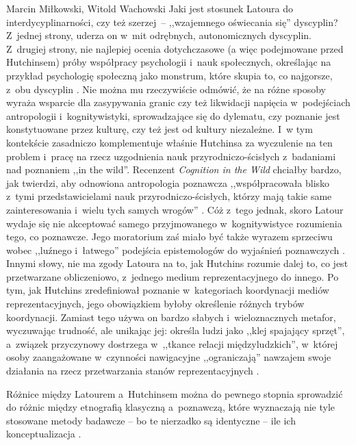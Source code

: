 \begin{artplenv2auth}{Marcin Miłkowski, Witold Wachowski}
Jaki jest stosunek Latoura do interdycyplinarności, czy też szerzej~-- ,,wzajemnego oświecania się'' dyscyplin? Z~jednej strony, uderza on w~mit odrębnych, autonomicznych dyscyplin. Z~drugiej strony, nie najlepiej ocenia dotychczasowe (a więc podejmowane przed Hutchinsem) próby współpracy psychologii i~nauk społecznych, określając na przykład psychologię społeczną jako monstrum, które skupia to, co najgorsze, z~obu dyscyplin
\parencite[][s.~58]{latour_cogito_1996}. %
 Nie można mu rzeczywiście odmówić, że na różne sposoby wyraża wsparcie dla zasypywania granic czy też likwidacji napięcia w~podejściach antropologii i~kognitywistyki, sprowadzające się do dylematu, czy poznanie jest konstytuowane przez kulturę, czy też jest od kultury niezależne. I~w tym kontekście zasadniczo komplementuje właśnie Hutchinsa za wyczulenie na ten problem i~pracę na rzecz uzgodnienia nauk przyrodniczo-ścisłych z~badaniami nad poznaniem ,,in the wild''. Recenzent \textit{Cognition in the Wild} chciałby bardzo, jak twierdzi, aby odnowiona antropologia poznawcza ,,współpracowała blisko z~tymi przedstawicielami nauk przyrodniczo-ścisłych, którzy mają takie same zainteresowania i~wielu tych samych wrogów'' 
\parencite[][s.~61]{latour_cogito_1996}. %
 Cóż z~tego jednak, skoro Latour wydaje się nie akceptować samego przyjmowanego w~kognitywistyce rozumienia tego, co poznawcze. Jego moratorium zaś miało być także wyrazem sprzeciwu wobec ,,luźnego i~łatwego'' podejścia epistemologów do wyjaśnień poznawczych 
\parencite[][s.~62]{latour_cogito_1996}. %
 Innymi słowy, nie ma zgody Latoura na to, jak Hutchins rozumie dalej to, co jest przetwarzane obliczeniowo, z~jednego medium reprezentacyjnego do innego. Po tym, jak Hutchins zredefiniował poznanie w~kategoriach koordynacji mediów reprezentacyjnych, jego obowiązkiem byłoby określenie różnych trybów koordynacji. Zamiast tego używa on bardzo słabych i~wieloznacznych metafor, wyczuwając trudność, ale unikając jej: określa ludzi jako ,,klej spajający sprzęt'', a~związek przyczynowy dostrzega w~,,tkance relacji międzyludzkich'', w~której osoby zaangażowane w~czynności nawigacyjne ,,ograniczają'' nawzajem swoje działania na rzecz przetwarzania stanów reprezentacyjnych 
\parencites[][s.~61]{latour_cogito_1996}[zob.][s.~202]{hutchins_cognition_1995}.%


Różnice między Latourem a~Hutchinsem można do pewnego stopnia sprowadzić do różnic między etnografią klasyczną a~poznawczą, które wyznaczają nie tyle stosowane metody badawcze -- bo te nierzadko są identyczne -- ile ich konceptualizacja
\parencite[][s.~838–839]{williams_using_2006}.%



\end{artplenv2auth}
